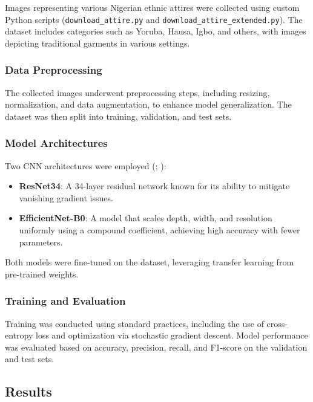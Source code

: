 \documentclass[
  letterpaper,
  DIV=11,
  numbers=noendperiod]{scrartcl}
\begin{document}
Images representing various Nigerian ethnic attires were collected using
custom Python scripts (\texttt{download\_attire.py} and
\texttt{download\_attire\_extended.py}). The dataset includes categories
such as Yoruba, Hausa, Igbo, and others, with images depicting
traditional garments in various settings.

\subsubsection{Data Preprocessing}\label{data-preprocessing}

The collected images underwent preprocessing steps, including resizing,
normalization, and data augmentation, to enhance model generalization.
The dataset was then split into training, validation, and test sets.

\subsubsection{Model Architectures}\label{model-architectures}

Two CNN architectures were employed (; ):

\begin{itemize}
\item
  \textbf{ResNet34}: A 34-layer residual network known for its ability
  to mitigate vanishing gradient issues.
\item
  \textbf{EfficientNet-B0}: A model that scales depth, width, and
  resolution uniformly using a compound coefficient, achieving high
  accuracy with fewer parameters.
\end{itemize}

Both models were fine-tuned on the dataset, leveraging transfer learning
from pre-trained weights.

\subsubsection{Training and Evaluation}\label{training-and-evaluation}

Training was conducted using standard practices, including the use of
cross-entropy loss and optimization via stochastic gradient descent.
Model performance was evaluated based on accuracy, precision, recall,
and F1-score on the validation and test sets.

\subsection{Results}\label{results}
\end{document}
